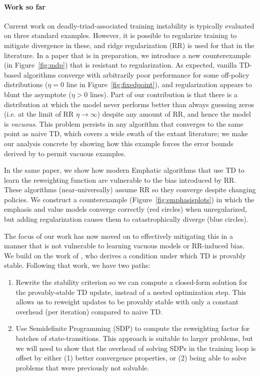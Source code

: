 \documentclass[11pt]{article}
\begin{document}
\paragraph{Work so far}
Current work on deadly-triad-associated training instability is typically evaluated on three standard examples. However, it is possible to regularize training to mitigate divergence in these, and ridge regularization (RR) is used for that in the literature.
In a paper that is in preparation, we introduce a new counterexample (in Figure~\ref{fig:mdp}) that is resistant to regularization. As expected, vanilla TD-based algorithms converge with arbitrarily poor performance for some off-policy distributions ($\eta=0$ line in Figure~\ref{fig:fixedpoint}), and regularization appears to blunt the asymptote ($\eta > 0$ lines). Part of our contribution is that there is a distribution at which the model never performs better than always guessing zeros (i.e. at the limit of RR $\eta\to\infty$) despite any amount of RR, and hence the model is \emph{vacuous}. This problem persists in any algorithm that converges to the same point as naive TD, which covers a wide swath of the extant literature; we make our analysis concrete by showing how this example forces the error bounds derived by \citet{zhang2021breaking} to permit vacuous examples.

In the same paper, we show how modern Emphatic algorithms that use TD to learn the reweighting function are vulnerable to the bias introduced by RR. These algorithms (near-universally) assume RR so they converge despite changing policies. We construct a counterexample (Figure~\ref{fig:emphasisplots}) in which the emphasis and value models converge correctly (red circles) when unregularized, but adding regularization causes them to catastrophically diverge (blue circles).

The focus of our work has now moved on to effectively mitigating this in a manner that is not vulnerable to learning vacuous models or RR-induced bias. We build on the work of \citet{kolter2011fixed}, who derives a condition under which TD is provably stable. Following that work, we have two paths:
\begin{enumerate}
    \item Rewrite the stability criterion so we can compute a closed-form solution for the provably-stable TD update, instead of a nested optimization step. This allows us to reweight updates to be provably stable with only a constant overhead (per iteration) compared to naive TD.
    \item Use Semidefinite Programming (SDP) to compute the reweighting factor for batches of state-transitions. This approach is suitable to larger problems, but we will need to show that the overhead of solving SDPs in the training loop is offset by either (1) better convergence properties, or (2) being able to solve problems that were previously not solvable.
\end{enumerate}
\end{document}
